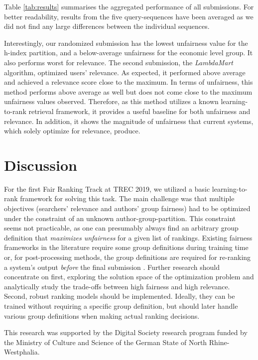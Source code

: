 \documentclass[sigconf, nonacm]{acmart}
\begin{document}
Table \ref{tab:results} summarises the aggregated performance of all submissions. For better readability, results from the five query-sequences have been averaged as we did not find any large differences between the individual sequences. 

Interestingly, our randomized submission has the lowest unfairness value for the h-index partition, and a below-average unfairness for the economic level group. It also performs worst for relevance. The second submission, the \emph{LambdaMart} algorithm, optimized users' relevance. As expected, it performed above average and achieved a relevance score close to the maximum. In terms of unfairness, this method performs above average as well but does not come close to the maximum unfairness values observed. Therefore, as this method utilizes a known learning-to-rank retrieval framework, it provides a useful baseline for both unfairness and relevance. In addition, it shows the magnitude of unfairness that current systems, which solely optimize for relevance, produce. 

\section{Discussion}

For the first Fair Ranking Track at TREC 2019, we utilized a basic learning-to-rank framework for solving this task. The main challenge was that multiple objectives (searchers' relevance and authors' group fairness) had to be optimized under the constraint of an unknown author-group-partition. This constraint seems not practicable, as one can presumably always find an arbitrary group definition that \emph{maximizes unfairness} for a given list of rankings. Existing fairness frameworks in the literature require some group definitions during training time or, for post-processing methods, the group definitions are required for re-ranking a system's output \emph{before} the final submission \cite{zehlike_fairsearch:_2019}. Further research should concentrate on first, exploring the solution space of the optimization problem and analytically study the trade-offs between high fairness and high relevance. Second, robust ranking models should be implemented. Ideally, they can be trained without requiring a specific group definition, but should later handle various group definitions when making actual ranking decisions.  


\begin{acks}
This research was supported by the Digital Society research program funded by the Ministry of Culture and Science of the German State of North Rhine-Westphalia.
\end{acks}



\end{document}
